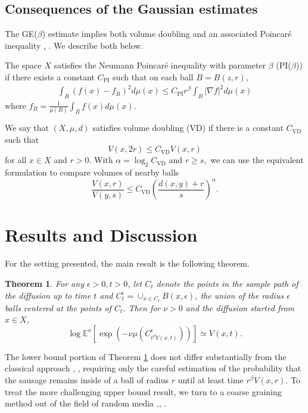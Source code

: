 \documentclass[letterpaper,oneside,english]{amsart}
\newtheorem{thm}{Theorem}
\begin{document}
\subsection{Consequences of the Gaussian estimates}\label{Consequences}
The GE($\beta$) estimate implies both volume doubling and an associated  Poincar\'{e} inequality \cite{SturmAnalysisOn}, \cite{LSCHebisch}.  We describe both below.  

The space $X$ satisfies the Neumann Poincar\'{e}
inequality with parameter $\beta$ (PI($\beta$))  if there exists a
constant $C_{\mathrm{PI}}$ such that on each ball $B=B(z,r)$,
\begin{eqnarray*}
\int_B (f(x) - f_B)^2 d\mu(x) \le C_{\mathrm{PI}} r^{\beta} \int_B |\nabla f|^2 d\mu(x)
\end{eqnarray*}
 where $f_B=\frac{1}{\mu(B)} \int_B f(x)d\mu(x)$. 

We say that $(X,\mu,d)$ satisfies volume doubling (VD) if
there is a constant $C_{\mathrm{VD}}$ such that \begin{equation}
  V(x,2r)\le C_{\mathrm{VD}}V(x,r)\label{eq:VD}\end{equation}
for all $x\in X$ and $r>0.$  With
$\alpha=\log_{2}C_{\mathrm{VD}}$ and $r\ge s,$ we can use the equivalent formulation to compare volumes of nearby balls \begin{equation}
  \frac{V(x,r)}{V(y,s)}\le
  C_{\mathrm{VD}}\left(\frac{d(x,y)+r}{s}\right)^{\alpha}.\label{eq:vd1}\end{equation}

\section{Results and Discussion}\label{Results}
For the setting presented, the main result is the following theorem.
\begin{thm} \label{main}
For any $\epsilon >0, t>0$, let $C_t$ denote the points in the sample path of the diffusion up to time $t$ and $C_t^{\epsilon}=\cup_{x\in C_t}B(x,\epsilon)$, the union of the radius $\epsilon$ balls centered at the points of  $C_t$.  Then for $\nu>0$ and the diffusion started from $x\in X$, 
\begin{equation}
\log \mathbb{E}^x\left[\exp\left(-\nu \mu\left(C_{t^{\beta}V(x,t)}^{\epsilon}\right)\right)\right] \simeq V(x,t).
\end{equation} 
\end{thm}

The lower bound portion of Theorem \ref{main} does not differ substantially from the classical approach \cite{DV}, \cite{Kac}, requiring only the careful estimation of the probability that the sausage remains inside of a ball of radius $r$ until at least time $r^{\beta}V(x,r)$.   To treat the more challenging upper bound result, we turn to a coarse graining method out of the field of random media \cite{SznBolt},\cite{Gibson}, \cite{SznBook}.  
\end{document}
